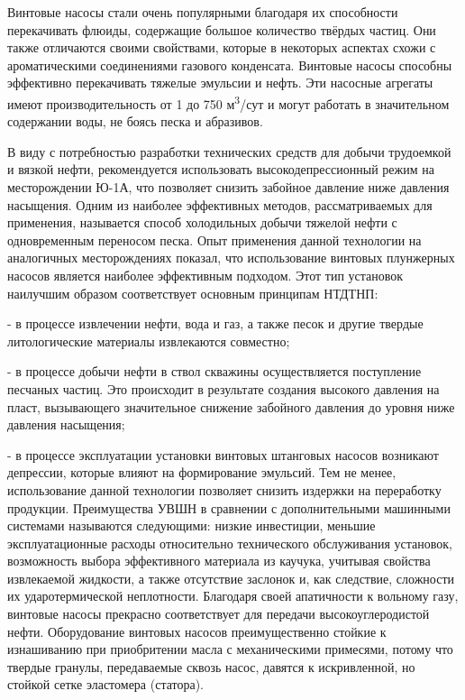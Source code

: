\begin{multicols}{2}
Винтовые насосы стали очень популярными благодаря их способности
перекачивать флюиды, содержащие большое количество твёрдых частиц. Они
также отличаются своими свойствами, которые в некоторых аспектах схожи с
ароматическими соединениями газового конденсата. Винтовые насосы
способны эффективно перекачивать тяжелые эмульсии и нефть. Эти насосные
агрегаты имеют производительность от 1 до 750 м\textsuperscript{3}/сут и
могут работать в значительном содержании воды, не боясь песка и
абразивов.

В виду с потребностью разработки технических средств для добычи
трудоемкой и вязкой нефти, рекомендуется использовать
высокодепрессионный режим на месторождении Ю-1А, что позволяет снизить
забойное давление ниже давления насыщения. Одним из наиболее эффективных
методов, рассматриваемых для применения, называется способ холодильных
добычи тяжелой нефти с одновременным переносом песка. Опыт применения
данной технологии на аналогичных месторождениях показал, что
использование винтовых плунжерных насосов является наиболее эффективным
подходом. Этот тип установок наилучшим образом соответствует основным
принципам НТДТНП:

- в процессе извлечении нефти, вода и газ, а также песок и другие
твердые литологические материалы извлекаются совместно;

- в процессе добычи нефти в ствол скважины осуществляется поступление
песчаных частиц. Это происходит в результате создания высокого
давления на пласт, вызывающего значительное снижение забойного
давления до уровня ниже давления насыщения;

- в процессе эксплуатации установки винтовых штанговых насосов возникают
депрессии, которые влияют на формирование эмульсий. Тем не менее,
использование данной технологии позволяет снизить издержки на
переработку продукции.
Преимущества УВШН в сравнении с дополнительными машинными системами
называются следующими: низкие инвестиции, меньшие эксплуатационные
расходы относительно технического обслуживания установок, возможность
выбора эффективного материала из каучука, учитывая свойства извлекаемой
жидкости, а также отсутствие заслонок и, как следствие, сложности их
ударотермической неплотности. Благодаря своей апатичности к вольному
газу, винтовые насосы прекрасно соответствует для передачи
высокоуглеродистой нефти. Оборудование винтовых насосов преимущественно
стойкие к изнашиванию при приобритении масла с механическими примесями,
потому что твердые гранулы, передаваемые сквозь насос, давятся к
искривленной, но стойкой сетке эластомера (статора).


\end{multicols}
